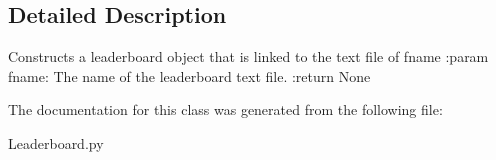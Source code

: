\subsection{Detailed Description}
\begin{DoxyVerb}Constructs a leaderboard object that is linked to the text file of fname
:param fname: The name of the leaderboard text file.
:return None
\end{DoxyVerb}
 

The documentation for this class was generated from the following file\+:\begin{DoxyCompactItemize}
\item 
Leaderboard.\+py\end{DoxyCompactItemize}
